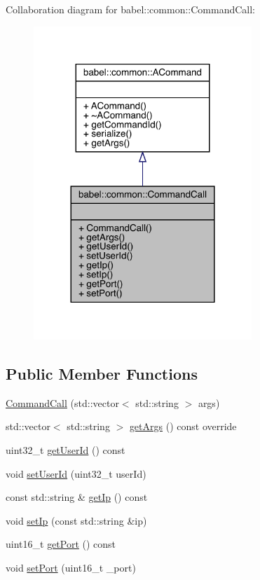 Collaboration diagram for babel\+:\+:common\+:\+:Command\+Call\+:\nopagebreak
\begin{figure}[H]
\begin{center}
\leavevmode
\includegraphics[width=233pt]{classbabel_1_1common_1_1_command_call__coll__graph}
\end{center}
\end{figure}
\subsection*{Public Member Functions}
\begin{DoxyCompactItemize}
\item 
\mbox{\hyperlink{classbabel_1_1common_1_1_command_call_af6deb1688aa452584423a1af201ae9da}{Command\+Call}} (std\+::vector$<$ std\+::string $>$ args)
\item 
std\+::vector$<$ std\+::string $>$ \mbox{\hyperlink{classbabel_1_1common_1_1_command_call_a008efa5d4ae4284c391f911b4708f99a}{get\+Args}} () const override
\item 
uint32\+\_\+t \mbox{\hyperlink{classbabel_1_1common_1_1_command_call_a6dfe0ea11c3e393021716a64afc568af}{get\+User\+Id}} () const
\item 
void \mbox{\hyperlink{classbabel_1_1common_1_1_command_call_ae572ee038cdc860fadc9131d14e4b123}{set\+User\+Id}} (uint32\+\_\+t user\+Id)
\item 
const std\+::string \& \mbox{\hyperlink{classbabel_1_1common_1_1_command_call_ae6cdec794a996cef7b6d8392fd10980d}{get\+Ip}} () const
\item 
void \mbox{\hyperlink{classbabel_1_1common_1_1_command_call_a58f28b212a295ab0626abc2067f352b9}{set\+Ip}} (const std\+::string \&ip)
\item 
uint16\+\_\+t \mbox{\hyperlink{classbabel_1_1common_1_1_command_call_a78586f615993e02fca506f46923ce4a4}{get\+Port}} () const
\item 
void \mbox{\hyperlink{classbabel_1_1common_1_1_command_call_af8d2a768b5464d5da991cab4890b2b67}{set\+Port}} (uint16\+\_\+t \+\_\+port)
\end{DoxyCompactItemize}


